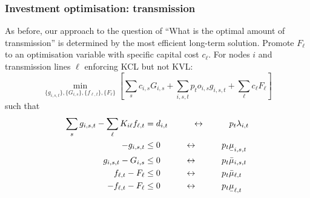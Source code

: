 \documentclass[10pt,aspectratio=169,dvipsnames]{beamer}
\def\l{\lambda}
\def\m{\mu}
\newcommand{\ubar}[1]{\text{\b{$#1$}}}
\begin{document}
\begin{frame}[fragile]
  \frametitle{Investment optimisation: transmission}

  As before, our approach to the question of \alert{``What is the
    optimal amount of transmission''} is determined by the most
  efficient long-term solution.    Promote $F_\ell$ to an optimisation variable with specific capital cost
   $c_\ell$. For nodes $i$ and transmission lines $\ell$ enforcing KCL but not KVL:
  \begin{equation*}
    \min_{\{g_{i,s,t}\},\{G_{i,s}\},\{f_{\ell,t}\},\{F_{\ell}\}}  \left[\sum_{s}c_{i,s} G_{i,s} +  \sum_{i,s,t} p_t o_{i,s} g_{i,s,t} + \sum_{\ell}c_\ell F_\ell \right]
  \end{equation*}
  such that
  \begin{align*}
    \sum_s g_{i,s,t} -  \sum_\ell K_{i\ell}f_{\ell,t} & = d_{i,t}  \hspace{1cm}\leftrightarrow\hspace{1cm} p_t \l_{i,t} \\
    - g_{i,s,t}  & \leq  0  \hspace{1cm}\leftrightarrow\hspace{1cm} p_t \ubar{\m}_{i,s,t} \\
    g_{i,s,t} - G_{i,s}  & \leq 0  \hspace{1cm}\leftrightarrow\hspace{1cm} p_t \bar{\m}_{i,s,t} \\
    f_{\ell,t} -  F_\ell & \leq 0  \hspace{1cm}\leftrightarrow\hspace{1cm} p_t\bar{\m}_{\ell,t} \\
        - f_{\ell,t} -  F_\ell & \leq 0  \hspace{1cm}\leftrightarrow\hspace{1cm} p_t\ubar{\m}_{\ell,t}
  \end{align*}

\end{frame}
\end{document}
